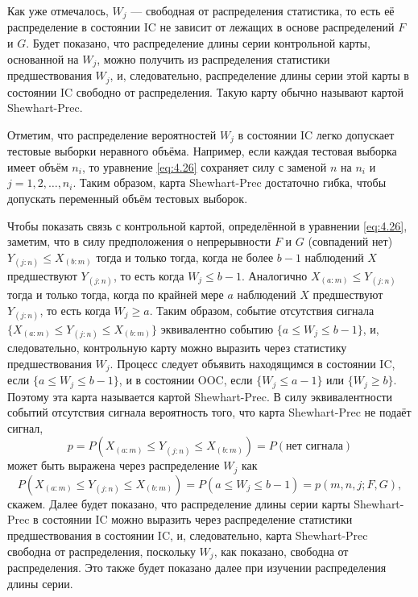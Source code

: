 Как уже отмечалось, \(W_j\) --- свободная от распределения статистика, то есть её распределение в состоянии IC не зависит от лежащих в основе распределений \(F\) и \(G\). Будет показано, что распределение длины серии контрольной карты, основанной на \(W_j\), можно получить из распределения статистики предшествования \(W_j\), и, следовательно, распределение длины серии этой карты в состоянии IC свободно от распределения. Такую карту обычно называют картой Shewhart-Prec.

Отметим, что распределение вероятностей \(W_j\) в состоянии IC легко допускает тестовые выборки неравного объёма. Например, если каждая тестовая выборка имеет объём \(n_i\), то уравнение \eqref{eq:4.26} сохраняет силу с заменой \(n\) на \(n_i\) и \(j = 1, 2, \ldots, n_i\). Таким образом, карта Shewhart-Prec достаточно гибка, чтобы допускать переменный объём тестовых выборок.

Чтобы показать связь с контрольной картой, определённой в уравнении \eqref{eq:4.26}, заметим, что в силу предположения о непрерывности \(F\) и \(G\) (совпадений нет) \(Y_{(j:n)} \le X_{(b:m)}\) тогда и только тогда, когда не более \(b - 1\) наблюдений \(X\) предшествуют \(Y_{(j:n)}\), то есть когда \(W_j \le b - 1\). Аналогично \(X_{(a:m)} \le Y_{(j:n)}\) тогда и только тогда, когда по крайней мере \(a\) наблюдений \(X\) предшествуют \(Y_{(j:n)}\), то есть когда \(W_j \ge a\). Таким образом, событие отсутствия сигнала \(\{X_{(a:m)} \le Y_{(j:n)} \le X_{(b:m)}\}\) эквивалентно событию \(\{a \le W_j \le b - 1\}\), и, следовательно, контрольную карту можно выразить через статистику предшествования \(W_j\). Процесс следует объявить находящимся в состоянии IC, если \(\{a \le W_j \le b - 1\}\), и в состоянии OOC, если \(\{W_j \le a - 1\}\) или \(\{W_j \ge b\}\). Поэтому эта карта называется картой Shewhart-Prec. В силу эквивалентности событий отсутствия сигнала вероятность того, что карта Shewhart-Prec не подаёт сигнал,
\[
	p = P\left( X_{(a:m)} \le Y_{(j:n)} \le X_{(b:m)} \right) = P(\text{нет сигнала})
\]
может быть выражена через распределение \(W_j\) как
\[
	P\left( X_{(a:m)} \le Y_{(j:n)} \le X_{(b:m)} \right) = P(a \le W_j \le b - 1) = p(m, n, j; F, G),
\]
скажем. Далее будет показано, что распределение длины серии карты Shewhart-Prec в состоянии IC можно выразить через распределение статистики предшествования в состоянии IC, и, следовательно, карта Shewhart-Prec свободна от распределения, поскольку \(W_j\), как показано, свободна от распределения. Это также будет показано далее при изучении распределения длины серии.

